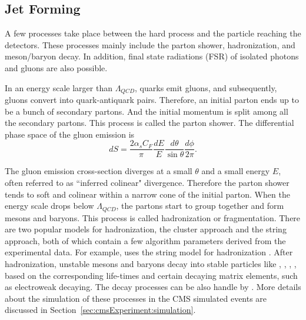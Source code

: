 



\subsection{Jet Forming}
\label{sec:physics:ppCollision:jetForming} 

A few processes take place between the hard process and the particle reaching the detectors. These processes mainly include the parton shower, hadronization, and meson/baryon decay. In addition, final state radiations (FSR) of isolated photons and gluons are also possible.

In an energy scale larger than $\Lambda_{QCD}$, quarks emit gluons, and subsequently, gluons convert into quark-antiquark pairs. Therefore, an initial parton ends up to be a bunch of secondary partons. And the initial momentum is split among all the secondary partons. This process is called the parton shower. The differential phase space of the gluon emission is
\begin{equation}
    dS = \frac{2\alpha_s C_F}{\pi} \frac{dE}{E}\frac{d\theta}{\sin \theta} \frac{d\phi}{2\pi}.
\end{equation}

\noindent The gluon emission cross-section diverges at a small $\theta$ and a small energy $E$, often referred to as ``inferred colinear" divergence. Therefore the parton shower tends to soft and colinear within a narrow cone of the initial parton. 
When the energy scale drops below $\Lambda_{QCD}$, the partons start to group together and form mesons and baryons. This process is called hadronization or fragmentation. There are two popular models for hadronization, the cluster approach and the string approach, both of which contain a few algorithm parameters derived from the experimental data. For example, \PYTHIA uses the string model for hadronization \cite{ANDERSSON198331}. After hadronization, unstable mesons and baryons decay into stable particles like \PGp, \PK, \PGg, \Pe, \PGm based on the corresponding life-times and certain decaying matrix elements, such as electroweak decaying. The decay processes can be also handle by \PYTHIA. More details about the simulation of these processes in the CMS simulated events are discussed in Section~\ref{sec:cmsExperiment:simulation}.

